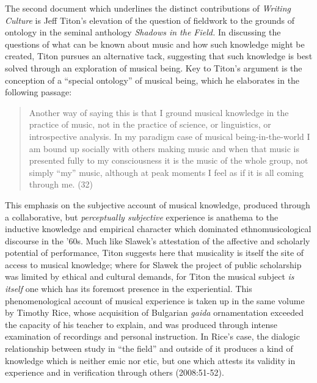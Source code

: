 The second document which underlines the distinct contributions of
\emph{Writing Culture} is Jeff Titon's elevation of the question of
fieldwork to the grounds of ontology in the seminal anthology
\emph{Shadows in the Field.} In discussing the questions of what can be
known about music and how such knowledge might be created, Titon pursues
an alternative tack, suggesting that such knowledge is best solved
through an exploration of musical being. Key to Titon's argument is the
conception of a ``special ontology'' of musical being, which he
elaborates in the following passage:

\begin{quote}
Another way of saying this is that I ground musical knowledge in the
practice of music, not in the practice of science, or linguistics, or
introspective analysis. In my paradigm case of musical
being-in-the-world I am bound up socially with others making music and
when that music is presented fully to my consciousness it is the music
of the whole group, not simply ``my'' music, although at peak moments I
feel as if it is all coming through me. (32)
\end{quote}

This emphasis on the subjective account of musical knowledge, produced
through a collaborative, but \emph{perceptually subjective} experience
is anathema to the inductive knowledge and empirical character which
dominated ethnomusicological discourse in the '60s. Much like Slawek's
attestation of the affective and scholarly potential of performance,
Titon suggests here that musicality is itself the site of access to
musical knowledge; where for Slawek the project of public scholarship
was limited by ethical and cultural demands, for Titon the musical
subject \emph{is itself} one which has its foremost presence in the
experiential. This phenomenological account of musical experience is
taken up in the same volume by Timothy Rice, whose acquisition of
Bulgarian \emph{gaida} ornamentation exceeded the capacity of his
teacher to explain, and was produced through intense examination of
recordings and personal instruction. In Rice's case, the dialogic
relationship between study in ``the field'' and outside of it produces a
kind of knowledge which is neither emic nor etic, but one which attests
its validity in experience and in verification through others
(2008:51-52).

